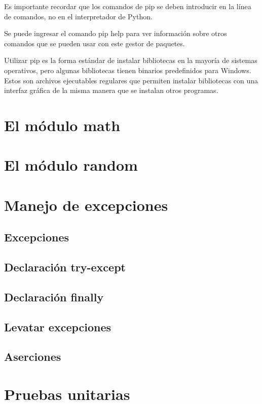 \documentclass{report}
\begin{document}

Es importante recordar que los comandos de pip se deben introducir en la línea de comandos, no en el interpretador de Python.

Se puede ingresar el comando pip help para ver información sobre otros comandos que se pueden usar con este gestor de paquetes.

Utilizar pip es la forma estándar de instalar bibliotecas en la mayoría de sistemas operativos, pero algunas bibliotecas tienen binarios predefinidos para Windows. Estos son archivos ejecutables regulares que permiten instalar bibliotecas con una interfaz gráfica de la misma manera que se instalan otros programas.

\clearpage\chapter{El módulo math}

\clearpage\chapter{El módulo random}

\clearpage\chapter{Manejo de excepciones}

\section{Excepciones}

\section{Declaración try-except}

\section{Declaración finally}

\section{Levatar excepciones}

\section{Aserciones}

\clearpage\chapter{Pruebas unitarias}
\end{document}
